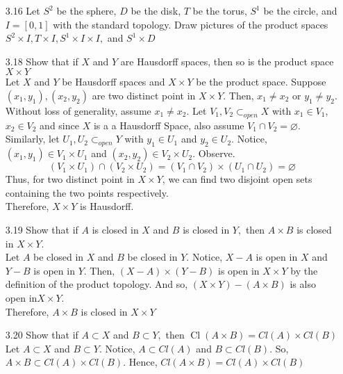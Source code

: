 \documentclass[12pt]{article}
\begin{document}
\begin{enumerate}
	\item[3.16] Let $S ^ { 2 }$ be the sphere, $D$ be the disk, $T$ be the torus, $S ^ { 1 }$ be the circle, and $I = [ 0,1 ]$ with the standard topology. Draw pictures of the product spaces
	$S ^ { 2 } \times I , T \times I , S ^ { 1 } \times I \times I ,$ and $S ^ { 1 } \times D$

	\item[3.18] Show that if $X$ and $Y$ are Hausdorff spaces, then so is the product space $X \times Y$\\
	Let $ X $ and $ Y $ be Hausdorff spaces and $ X \times Y $ be the product space. Suppose $ (x_1,y_1),(x_2,y_2) $ are two distinct point in $ X \times Y $. Then, $ x_1 \not = x_2 $ or $ y_1 \not = y_2 $. Without loss of generality, assume $ x_1\not = x_2 $. Let $ V_1,V_2 \subset_{open} X$ with $ x_1\in V_1 $, $ x_2\in V_2 $ and since $ X $ is a a Hausdorff Space, also assume $ V_1\cap V_2 = \varnothing $. \\
	Similarly, let $ U_1,U_2 \subset_{open} Y $ with $ y_1 \in U_1 $ and $ y_2\in U_2 $. Notice, $ (x_1,y_1)\in V_1 \times U_1 $ and $ (x_2,y_2)\in V_2\times U_2 $. Observe.
		\[(V_1 \times U_1)\cap (V_2\times U_2) = (V_1\cap V_2)\times ( U_1\cap U_2) = \varnothing\]
	Thus, for two distinct point in $ X\times Y $, we can find two disjoint open sets containing the two points respectively.\\
	Therefore, $ X\times Y $ is Hausdorff.
	\item[3.19] Show that if $A$ is closed in $X$ and $B$ is closed in $Y ,$ then $A \times B$ is closed in $X \times Y .$\\
	Let $ A $ be closed in $ X $ and $ B $ be closed in $ Y $. Notice, $ X-A $ is open in $ X $ and $ Y-B $ is open in $ Y $. Then, $ (X-A)\times(Y-B) $ is open in $ X\times Y $ by the definition of the product topology. And so, $ (X\times Y)-(A\times B) $ is also open in$ X\times Y $.\\
	Therefore, $ A\times B$ is closed in $ X\times Y $
	\item[3.20] Show that if $A \subset X$ and $B \subset Y ,$ then $\operatorname { Cl } ( A \times B ) = C l ( A ) \times C l ( B )$\\
	Let $ A \subset X $ and $ B \subset Y $. Notice, $ A\subset Cl(A) $ and $ B\subset Cl(B) $. So, $ A\times B \subset Cl(A)\times Cl(B) $. Hence, $ Cl(A\times B) = Cl(A)\times Cl(B) $


\end{enumerate}
\end{document}

